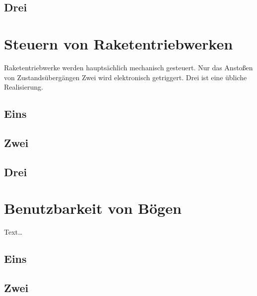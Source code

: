 \documentclass[11pt,a4paper]{report}
\begin{document}
\blindtext[1]
\blindtext[2]
\blindtext[4]
\blindtext[2]

\section{Drei}

\blindtext[3]
\blindtext[2]
\blindtext[2]
\blindtext[1]

\chapter{Steuern von Raketentriebwerken} \label{chap:rocket}

Raketentriebwerke werden hauptsächlich mechanisch gesteuert.
Nur das Anstoßen von Zustandsübergängen Zwei wird elektronisch
getriggert. Drei ist eine übliche Realisierung.

\section{Eins}

\blindtext[2]
\blindtext[4]
\blindtext[3]
\blindtext[3]
\blindtext[2]

\section{Zwei}

\blindtext[3]
\blindtext[1]
\blindtext[3]
\blindtext[4]
\blindtext[1]

\section{Drei}

\blindtext[2]
\blindtext[3]
\blindtext[2]
\blindtext[4]

\chapter{Benutzbarkeit von Bögen} \label{chap:bow}

Text\ldots

\section{Eins}

\blindtext[1]
\blindtext[2]
\blindtext[3]
\blindtext[2]
\blindtext[1]

\section{Zwei}
\end{document}
